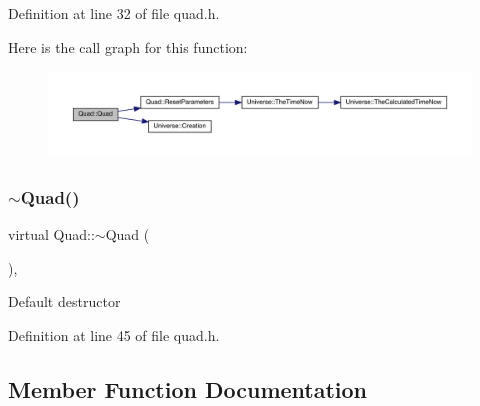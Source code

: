 Definition at line 32 of file quad.\+h.

Here is the call graph for this function\+:\nopagebreak
\begin{figure}[H]
\begin{center}
\leavevmode
\includegraphics[width=350pt]{class_quad_a4bb08fd4d953ce61076ed06b51ee2793_cgraph}
\end{center}
\end{figure}
\mbox{\label{class_quad_a64a53d5b7a7811c34a85054828f74866}} 
\subsubsection{\texorpdfstring{$\sim$\+Quad()}{~Quad()}}
{\footnotesize\ttfamily virtual Quad\+::$\sim$\+Quad (\begin{DoxyParamCaption}{ }\end{DoxyParamCaption})\hspace{0.3cm}{\ttfamily [inline]}, {\ttfamily [virtual]}}

Default destructor 

Definition at line 45 of file quad.\+h.



\subsection{Member Function Documentation}
\mbox{\label{class_quad_a80c2eb7c282e1566c5f7f235611b6206}} 
